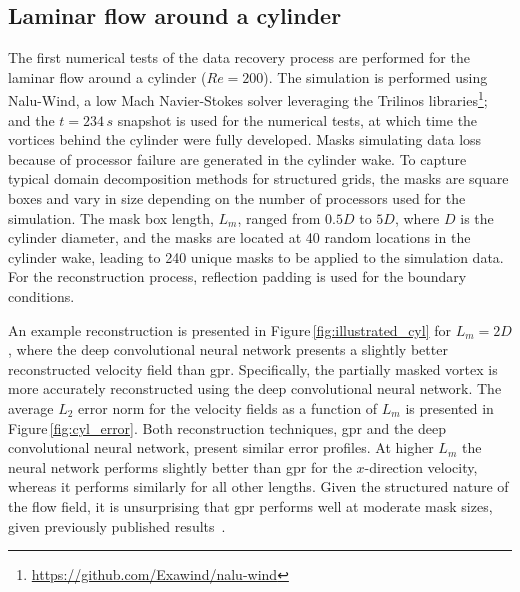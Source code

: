 \documentclass[review]{elsarticle}
\begin{document}
\subsection{Laminar flow around a cylinder}\label{sec:cylinder}
The first numerical tests of the data recovery process are performed
for the laminar flow around a cylinder ($Re = 200$). The simulation is
performed using Nalu-Wind, a low Mach Navier-Stokes solver leveraging
the Trilinos
libraries\footnote{\url{https://github.com/Exawind/nalu-wind}}; and the
$t=234\,\unit{s}$ snapshot is used for the numerical tests, at which
time the vortices behind the cylinder were fully developed. Masks
simulating data loss because of processor failure are generated in the
cylinder wake. To capture typical domain decomposition methods for
structured grids, the masks are square boxes and vary in size
depending on the number of processors used for the simulation. The
mask box length, $L_m$, ranged from $0.5D$ to $5D$, where $D$ is the
cylinder diameter, and the masks are located at 40 random locations in
the cylinder wake, leading to 240 unique masks to be applied to the
simulation data. For the reconstruction process, reflection padding is
used for the boundary conditions.

An example reconstruction is presented in
Figure\,\ref{fig:illustrated_cyl} for $L_m=2D$, where the deep
convolutional neural network presents a slightly better reconstructed
velocity field than \gls{gpr}. Specifically, the partially masked
vortex is more accurately reconstructed using the deep convolutional
neural network. The average $L_2$ error norm for the velocity fields
as a function of $L_m$ is presented in
Figure\,\ref{fig:cyl_error}. Both reconstruction techniques, \gls{gpr}
and the deep convolutional neural network, present similar error
profiles. At higher $L_m$ the neural network performs slightly better
than \gls{gpr} for the $x$-direction velocity, whereas it performs
similarly for all other lengths. Given the structured nature of the
flow field, it is unsurprising that \gls{gpr} performs well at
moderate mask sizes, given previously published
results~\cite{Gunes2006}.
\end{document}
